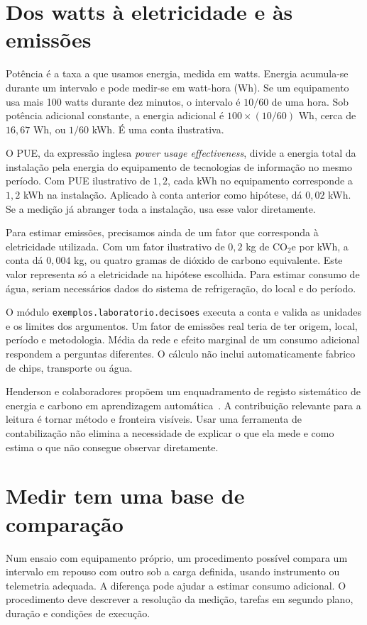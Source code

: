\section{Dos watts à eletricidade e às emissões}
Potência é a taxa a que usamos energia, medida em watts. Energia acumula-se durante um intervalo e pode medir-se em watt-hora (Wh). Se um equipamento usa mais 100 watts durante dez minutos, o intervalo é $10/60$ de uma hora. Sob potência adicional constante, a energia adicional é $100\times(10/60)$ Wh, cerca de $16{,}67$ Wh, ou $1/60$ kWh. É uma conta ilustrativa.

O PUE, da expressão inglesa \emph{power usage effectiveness}, divide a energia total da instalação pela energia do equipamento de tecnologias de informação no mesmo período. Com PUE ilustrativo de $1{,}2$, cada kWh no equipamento corresponde a $1{,}2$ kWh na instalação. Aplicado à conta anterior como hipótese, dá $0{,}02$ kWh. Se a medição já abranger toda a instalação, usa esse valor diretamente.

Para estimar emissões, precisamos ainda de um fator que corresponda à eletricidade utilizada. Com um fator ilustrativo de $0{,}2$ kg de CO$_2$e por kWh, a conta dá $0{,}004$ kg, ou quatro gramas de dióxido de carbono equivalente. Este valor representa só a eletricidade na hipótese escolhida. Para estimar consumo de água, seriam necessários dados do sistema de refrigeração, do local e do período.

O módulo \texttt{exemplos.laboratorio.decisoes} executa a conta e valida as unidades e os limites dos argumentos. Um fator de emissões real teria de ter origem, local, período e metodologia. Média da rede e efeito marginal de um consumo adicional respondem a perguntas diferentes. O cálculo não inclui automaticamente fabrico de chips, transporte ou água.

Henderson e colaboradores propõem um enquadramento de registo sistemático de energia e carbono em aprendizagem automática~\citep{henderson2020}. A contribuição relevante para a leitura é tornar método e fronteira visíveis. Usar uma ferramenta de contabilização não elimina a necessidade de explicar o que ela mede e como estima o que não consegue observar diretamente.

\section{Medir tem uma base de comparação}
Num ensaio com equipamento próprio, um procedimento possível compara um intervalo em repouso com outro sob a carga definida, usando instrumento ou telemetria adequada. A diferença pode ajudar a estimar consumo adicional. O procedimento deve descrever a resolução da medição, tarefas em segundo plano, duração e condições de execução.

